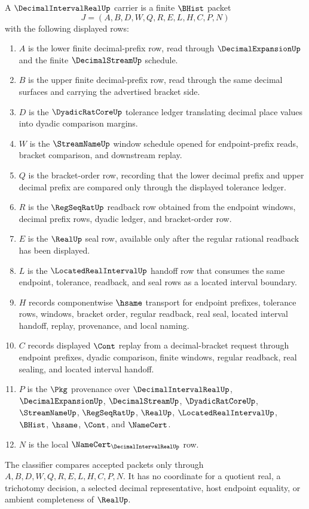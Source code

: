 \begin{definition}
\label{def:decimal-interval-real-carrier}
A $\DecimalIntervalRealUp$ carrier is a finite $\BHist$ packet
$$
J=(A,B,D,W,Q,R,E,L,H,C,P,N)
$$
with the following displayed rows:
\begin{enumerate}
\item $A$ is the lower finite decimal-prefix row, read through $\DecimalExpansionUp$ and the finite $\DecimalStreamUp$ schedule.
\item $B$ is the upper finite decimal-prefix row, read through the same decimal surfaces and carrying the advertised bracket side.
\item $D$ is the $\DyadicRatCoreUp$ tolerance ledger translating decimal place values into dyadic comparison margins.
\item $W$ is the $\StreamNameUp$ window schedule opened for endpoint-prefix reads, bracket comparison, and downstream replay.
\item $Q$ is the bracket-order row, recording that the lower decimal prefix and upper decimal prefix are compared only through the displayed tolerance ledger.
\item $R$ is the $\RegSeqRatUp$ readback row obtained from the endpoint windows, decimal prefix rows, dyadic ledger, and bracket-order row.
\item $E$ is the $\RealUp$ seal row, available only after the regular rational readback has been displayed.
\item $L$ is the $\LocatedRealIntervalUp$ handoff row that consumes the same endpoint, tolerance, readback, and seal rows as a located interval boundary.
\item $H$ records componentwise $\hsame$ transport for endpoint prefixes, tolerance rows, windows, bracket order, regular readback, real seal, located interval handoff, replay, provenance, and local naming.
\item $C$ records displayed $\Cont$ replay from a decimal-bracket request through endpoint prefixes, dyadic comparison, finite windows, regular readback, real sealing, and located interval handoff.
\item $P$ is the $\Pkg$ provenance over $\DecimalIntervalRealUp$, $\DecimalExpansionUp$, $\DecimalStreamUp$, $\DyadicRatCoreUp$, $\StreamNameUp$, $\RegSeqRatUp$, $\RealUp$, $\LocatedRealIntervalUp$, $\BHist$, $\hsame$, $\Cont$, and $\NameCert$.
\item $N$ is the local $\NameCert_{\DecimalIntervalRealUp}$ row.
\end{enumerate}
The classifier compares accepted packets only through $A,B,D,W,Q,R,E,L,H,C,P,N$. It has no coordinate for a quotient real, a trichotomy decision, a selected decimal representative, host endpoint equality, or ambient completeness of $\RealUp$.
\end{definition}

